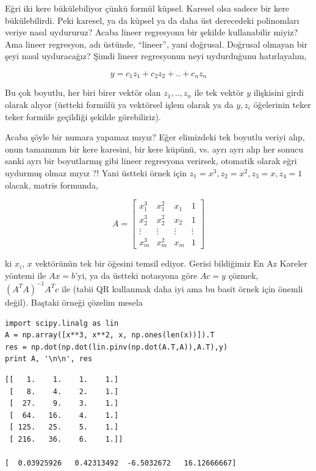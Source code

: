 \documentclass[12pt,fleqn]{article}\usepackage{../../common}
\begin{document}
Eğri iki kere bükülebiliyor çünkü formül küpsel. Karesel olsa sadece bir
kere bükülebilirdi. Peki karesel, ya da küpsel ya da daha üst derecedeki
polinomları veriye nasıl uydururuz? Acaba lineer regresyonu bir şekilde
kullanabilir miyiz? Ama lineer regresyon, adı üstünde, ``lineer'', yani
doğrusal. Doğrusal olmayan bir şeyi nasıl uyduracağız? Şimdi lineer
regresyonun neyi uydurduğunu hatırlayalım,

$$ y = c_1 z_1 + c_2 z_2 + .. + c_nz_n $$

Bu çok boyutlu, her biri birer vektör olan $z_1,..,z_n$ ile tek vektör $y$
ilişkisini girdi olarak alıyor (üstteki formülü ya vektörsel işlem olarak
ya da $y,z_i$ öğelerinin teker teker formüle geçildiği şekilde
görebiliriz). 

Acaba şöyle bir numara yapamaz mıyız? Eğer elimizdeki tek boyutlu veriyi
alıp, onun tamamının bir kere karesini, bir kere küpünü, vs. ayrı ayrı alıp
her sonucu sanki ayrı bir boyutlarmış gibi lineer regresyona verirsek,
otomatik olarak eğri uydurmuş olmaz mıyız ?! Yani üstteki örnek için
$z_1=x^3,z_2=x^2,z_3=x,z_4=1$ olacak, matris formunda,

$$ A = 
\left[\begin{array}{rrrr}
x_1^3 & x_1^2 & x_1 & 1 \\
x_2^3 & x_2^2 & x_2 & 1 \\
\vdots & \vdots & \vdots & \vdots \\
x_m^3 & x_m^2 & x_m & 1 
\end{array}\right]
 $$

ki $x_i$, $x$ vektörünün tek bir öğesini temsil ediyor. Gerisi bildiğimiz En
Az Kareler yöntemi ile $Ax=b$'yi, ya da üstteki notasyona göre $Ac=y$
çözmek, $(A^TA)^{-1}A^Tc$ ile (tabii QR kullanmak daha iyi ama bu basit
örnek için önemli değil). Baştaki örneği çözelim mesela

\begin{verbatim}
import scipy.linalg as lin
A = np.array([x**3, x**2, x, np.ones(len(x))]).T
res = np.dot(np.dot(lin.pinv(np.dot(A.T,A)),A.T),y)
print A, '\n\n', res
\end{verbatim}

\begin{verbatim}
[[   1.    1.    1.    1.]
 [   8.    4.    2.    1.]
 [  27.    9.    3.    1.]
 [  64.   16.    4.    1.]
 [ 125.   25.    5.    1.]
 [ 216.   36.    6.    1.]] 

[  0.03925926   0.42313492  -6.5032672   16.12666667]
\end{verbatim}
\end{document}
